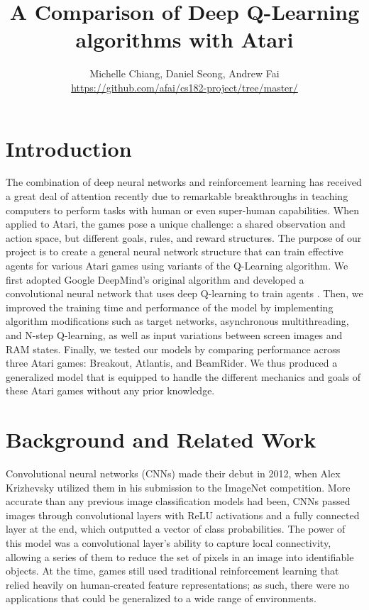 \documentclass[11pt]{article}
\title{A Comparison of Deep Q-Learning algorithms with Atari}
\author{Michelle Chiang, Daniel Seong, Andrew Fai \\ \href{https://github.com/afai/cs182-project/tree/master/}{https://github.com/afai/cs182-project/tree/master/}}
\begin{document}
\maketitle{}


\section{Introduction}

The combination of deep neural networks and reinforcement learning has received a great deal of attention recently due to remarkable breakthroughs in teaching computers to perform tasks with human or even super-human capabilities. When applied to Atari, the games pose a unique challenge: a shared observation and action space, but different goals, rules, and reward structures. The purpose of our project is to create a general neural network structure that can train effective agents for various Atari games using variants of the Q-Learning algorithm. We first adopted Google DeepMind's original algorithm and developed a convolutional neural network that uses deep Q-learning to train agents \cite{mnih}. Then, we improved the training time and performance of the model by implementing algorithm modifications such as target networks, asynchronous multithreading, and N-step Q-learning, as well as input variations between screen images and RAM states. Finally, we tested our models by comparing performance across three Atari games: Breakout, Atlantis, and BeamRider. We thus produced a generalized model that is equipped to handle the different mechanics and goals of these Atari games without any prior knowledge.

\section{Background and Related Work}

Convolutional neural networks (CNNs) made their debut in 2012, when Alex Krizhevsky utilized them in his submission to the ImageNet competition. More accurate than any previous image classification models had been, CNNs passed images through convolutional layers with ReLU activations and a fully connected layer at the end, which outputted a vector of class probabilities. The power of this model was a convolutional layer's ability to capture local connectivity, allowing a series of them to reduce the set of pixels in an image into identifiable objects. At the time, games still used traditional reinforcement learning that relied heavily on human-created feature representations; as such, there were no applications that could be generalized to a wide range of environments.
\end{document}
